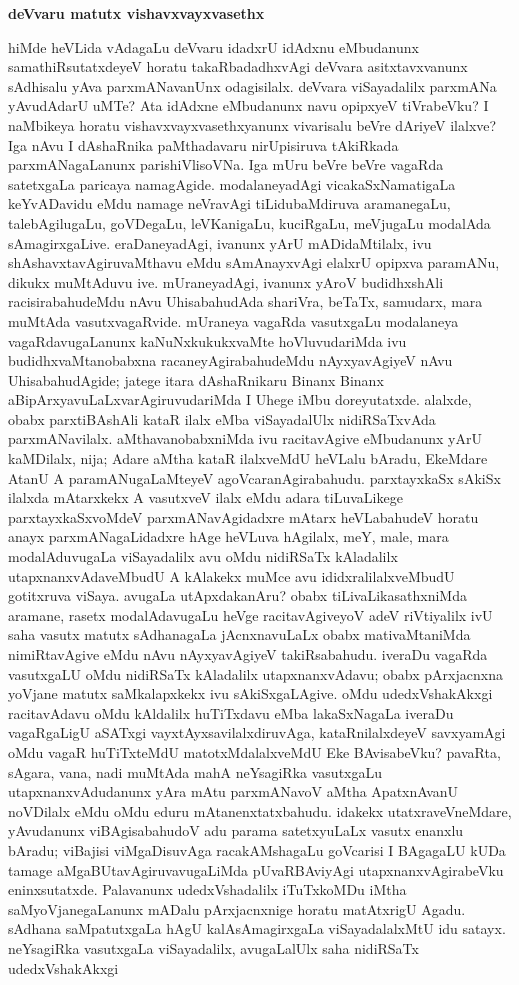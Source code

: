 \smallskip
\begin{center}
{\Large\bf deVvaru matutx vishavxvayxvasethx}
\end{center}

hiMde heVLida vAdagaLu deVvaru idadxrU idAdxnu eMbudanunx samathiRsu\-tatx\-deyeV horatu takaRbadadhxvAgi deVvara asitxtavxvanunx sAdhisalu yAva parxmANavanUnx odagisilalx. deVvara viSayadalilx parxmANa yAvudAdarU uMTe? Ata idAdxne eMbu\-danunx navu opipxyeV tiVrabeVku? I naMbikeya horatu vishavxvayxvasethxyanunx vivarisalu beVre dAriyeV ilalxve? Iga nAvu I dAshaRnika paMthadavaru nirUpisiruva tAkiRkada parxmANagaLanunx parishiVlisoVNa. Iga mUru beVre beVre vagaRda satetxgaLa paricaya namagAgide. modalaneyadAgi vicakaSxNamatigaLa keYvADavidu eMdu namage neVravAgi tiLidubaMdiruva aramanegaLu, talebAgilugaLu, goVDegaLu, leVKanigaLu, kuciRgaLu, meVjugaLu modalAda sAmagirxgaLive. eraDaneyadAgi, ivanunx yArU mADidaMtilalx, ivu shAshavxtavAgiruvaMthavu eMdu sAmAnayxvAgi elalxrU opipxva paramANu, dikukx muMtAduvu ive. mUraneyadAgi, ivanunx yAroV budidhxshAli racisirabahudeMdu nAvu UhisabahudAda shariVra, beTaTx, samudarx, mara muMtAda vasutxvagaRvide. mUraneya vagaRda vasutxgaLu modalaneya vagaRdavugaLanunx kaNuNxkukukxvaMte hoVluvudariMda ivu budidhxvaMtanobabxna racaneyAgirabahudeMdu nAyxyavAgiyeV nAvu UhisabahudAgide; jatege itara dAshaRnikaru Binanx Binanx aBipArxyavuLaLxvarAgiruvudariMda I Uhege iMbu doreyutatxde. alalxde, obabx parxtiBAshAli kataR ilalx eMba viSayadalUlx nidiRSaTxvAda parxmANavilalx. aMthavanobabxniMda ivu racitavAgive eMbudanunx yArU kaMDilalx, nija; Adare aMtha kataR ilalxveMdU heVLalu bAradu, EkeMdare AtanU A paramANugaLaMteyeV agoVcaranAgirabahudu. parxtayxkaSx sAkiSx ilalxda mAtarxkekx A vasutxveV ilalx eMdu adara tiLuvaLikege parxtayxkaSxvoMdeV parxmANavAgidadxre mAtarx heVLabahudeV horatu anayx parxmANagaLidadxre hAge heVLuva hAgilalx, meY, male, mara modalAduvugaLa viSayadalilx avu oMdu nidiRSaTx kAladalilx utapxnanxvAdaveMbudU A kAlakekx muMce avu ididxralilalxveMbudU gotitxruva viSaya. avugaLa utApxdakanAru? obabx tiLivaLikasathxniMda aramane, rasetx modalAdavugaLu heVge racitavAgiveyoV adeV riVtiyalilx ivU saha vasutx matutx sAdhanagaLa jAcnxnavuLaLx obabx mativaMtaniMda nimiRtavAgive eMdu nAvu nAyxyavAgiyeV takiRsabahudu. iveraDu vagaRda vasutxgaLU oMdu nidiRSaTx kAladalilx utapxnanxvAdavu; obabx pArxjacnxna yoVjane matutx saMkalapxkekx ivu sAkiSxgaLAgive. oMdu udedxVshakAkxgi racitavAdavu oMdu kAldalilx huTiTxdavu eMba lakaSxNagaLa iveraDu vagaRgaLigU aSATxgi vayxtAyxsavilalxdiruvAga, kataRnilalxdeyeV savxyamAgi oMdu vagaR huTiTxteMdU matotxMdalalxveMdU Eke BAvisabeVku? pavaRta, sAgara, vana, nadi muMtAda mahA neYsagiRka vasutxgaLu utapxnanxvAdudanunx yAra mAtu parxmANavoV aMtha ApatxnAvanU noVDilalx eMdu oMdu eduru mAtanenxtatxbahudu. idakekx utatxraveVneMdare, yAvudanunx viBAgisabahudoV adu parama satetxyuLaLx vasutx enanxlu bAradu; viBajisi viMgaDisuvAga racakAMshagaLu goVcarisi I BAgagaLU kUDa tamage aMgaBUtavAgiruvavugaLiMda pUvaRBAviyAgi utapxnanxvAgirabeVku eninxsutatxde. Palavanunx udedxVshadalilx iTuTxkoMDu iMtha saMyoVjanegaLanunx mADalu pArxjacnxnige horatu matAtxrigU Agadu. sAdhana saMpatutxgaLa hAgU kalAsAmagirxgaLa viSayadalalxMtU idu satayx. neYsagiRka vasutxgaLa viSayadalilx, avugaLalUlx saha nidiRSaTx udedxVshakAkxgi 
